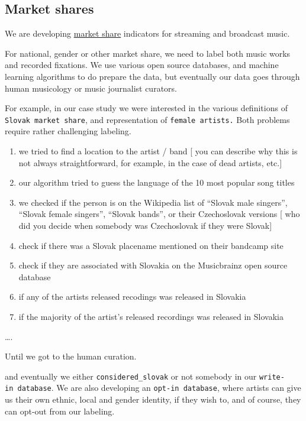\documentclass[
  a4paper,
  openany, a4paper, oneside]{book}
\providecommand{\tightlist}{%
  \setlength{\itemsep}{0pt}\setlength{\parskip}{0pt}}
\begin{document}
\hypertarget{market-shares}{%
\subsection{Market shares}\label{market-shares}}

We are developing \href{https://data.music.dataobservatory.eu/music-diversity.html\#cross-border-circulation-of-works}{market share} indicators for streaming and broadcast music.

For national, gender or other market share, we need to label both music works and recorded fixations. We use various open source databases, and machine learning algorithms to do prepare the data, but eventually our data goes through human musicology or music journalist curators.

For example, in our case study we were interested in the various definitions of \texttt{Slovak\ market\ share}, and representation of \texttt{female\ artists.} Both problems require rather challenging labeling.

\begin{enumerate}
\def\labelenumi{\alph{enumi})}
\tightlist
\item
  we tried to find a location to the artist / band {[} you can describe why this is not always straightforward, for example, in the case of dead artists, etc.{]}
\item
  our algorithm tried to guess the language of the 10 most popular song titles
\item
  we checked if the person is on the Wikipedia list of ``Slovak male singers'', ``Slovak female singers'', ``Slovak bands'', or their Czechoslovak versions {[} who did you decide when somebody was Czechoslovak if they were Slovak{]}
\item
  check if there was a Slovak placename mentioned on their bandcamp site
\item
  check if they are associated with Slovakia on the Musicbrainz open source database
\item
  if any of the artists released recodings was released in Slovakia
\item
  if the majority of the artist's released recordings was released in Slovakia
\end{enumerate}

\ldots.

Until we got to the human curation.

and eventually we either \texttt{considered\_slovak} or not somebody in our \texttt{write-in\ database}. We are also developing an \texttt{opt-in\ database}, where artists can give us their own ethnic, local and gender identity, if they wish to, and of course, they can opt-out from our labeling.
\end{document}
